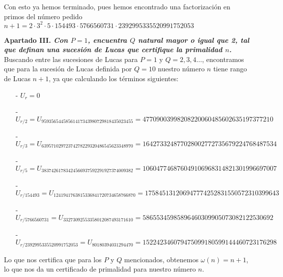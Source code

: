 \documentclass[fleqn]{article}
\begin{document}
    Con esto ya hemos terminado, pues hemos encontrado una factorización en primos del número pedido 
    $n+1 = 2 \cdot 3^2 \cdot 5 \cdot 154493 \cdot 5766560731 \cdot 2392995335520991752053$

    




    \newpage
    \textbf{Apartado III. \textit{Con $P=1$, encuentra $Q$ natural mayor o igual que 2, tal que definan una sucesión de
            Lucas que certifique la primalidad $n$.}} \\
    Buscando entre las sucesiones de Lucas para $P = 1$ y $Q = 2,3,4\dots$, encontramos que para la sucesión de Lucas definida por 
    $Q = 10$ nuestro número $n$ tiene rango de Lucas $n+1$, ya que calculando los términos siguientes:

    \begin{enumerate}
        \item[-] $U_{r} = 0$
        \item[-] $U_{r/2} = U_ {95935654458561417343980729818435023455} = 47709003998208220060485602635197377210$
        \item[-] $U_{r/3} = U_ {63957102972374278229320486545623348970} = 164273324877028002772735679224768487534$
        \item[-] $U_{r/5} = U_ {38374261783424566937592291927374009382} = 106047746876049106968314821301996697007$
        \item[-] $U_{r/154493} = U_ {1241941763815336841720734658766870} = 175845131206947774252831550572310399643$
        \item[-] $U_{r/5766560731} = U_ {33273092553358012087493171610} = 58655345985896460309905073082122530692$
        \item[-] $U_{r/2392995335520991752053} = U_ {80180394031294470} = 152242346079475099180599144460723176298$
    \end{enumerate}
    Lo que nos certifica que para los $P$ y $Q$ mencionados, obtenemos $\omega(n) = n+1$, lo que nos da un certificado
    de primalidad para nuestro número $n$.
\end{document}
